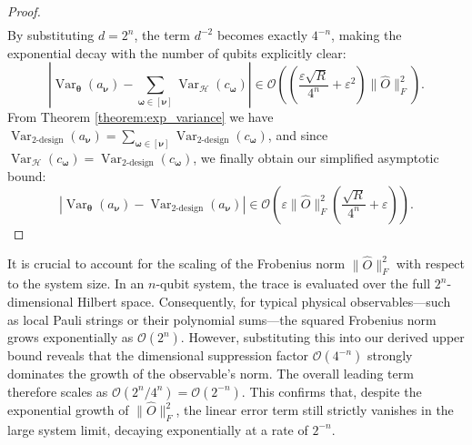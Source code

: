 \documentclass[%
 reprint,
 amsmath,amssymb,
 aps,
 pra,
]{revtex4-2}
\theoremstyle{definition}
\begin{document}
\begin{proof}
\begin{align}
\end{align}
By substituting $d = 2^n$, the term $d^{-2}$ becomes exactly $4^{-n}$, making the exponential decay with the number of qubits explicitly clear:
\begin{equation}
\left| \operatorname{Var}_{\bm{\theta}}(a_{\bm{\nu}}) - \sum_{\bm{\omega}\in[\bm{\nu}]} \operatorname{Var}_{\mathcal{H}}(c_{\bm{\omega}}) \right|
\in \mathcal{O}\left( \left( \frac{\varepsilon \sqrt{R}}{4^n} + \varepsilon^2 \right) \|\hat{O}\|_F^2 \right).
\end{equation}
From Theorem \ref{theorem:exp_variance} we have $\operatorname{Var}_{\text{2-design}}(a_{\bm{\nu}}) = \sum_{\bm{\omega} \in [\bm{\nu}]} \operatorname{Var}_{\text{2-design}}(c_{\bm{\omega}})$, and since $\operatorname{Var}_{\mathcal{H}}(c_{\bm{\omega}})=\operatorname{Var}_{\text{2-design}}(c_{\bm{\omega}})$, we finally obtain our simplified asymptotic bound:
\begin{equation}
\left|
\operatorname{Var}_{\bm{\theta}}(a_{\bm{\nu}})
-
\operatorname{Var}_{\text{2-design}}(a_{\bm{\nu}})
\right|
\in
\mathcal{O}\left( \varepsilon \|\hat{O}\|_F^2 \left( \frac{\sqrt{R}}{4^n} + \varepsilon \right) \right).
\end{equation}
\end{proof}


It is crucial to account for the scaling of the Frobenius norm $\|\hat{O}\|_F^2$ with respect to the system size. In an $n$-qubit system, the trace is evaluated over the full $2^n$-dimensional Hilbert space. Consequently, for typical physical observables—such as local Pauli strings or their polynomial sums—the squared Frobenius norm grows exponentially as $\mathcal{O}(2^n)$. However, substituting this into our derived upper bound reveals that the dimensional suppression factor $\mathcal{O}(4^{-n})$ strongly dominates the growth of the observable's norm. The overall leading term therefore scales as $\mathcal{O}(2^n / 4^n) = \mathcal{O}(2^{-n})$. This confirms that, despite the exponential growth of $\|\hat{O}\|_F^2$, the linear error term still strictly vanishes in the large system limit, decaying exponentially at a rate of $2^{-n}$.
\end{document}
